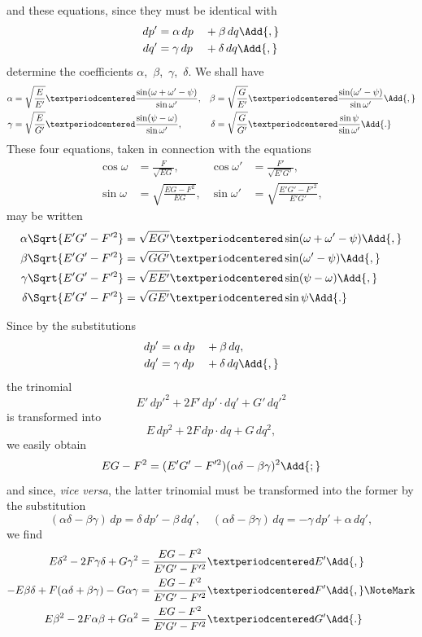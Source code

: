 and these equations, since they must be identical with
\begin{alignat*}{2}
dp' &= \alpha\, dp &&+ \beta\,  dq\Add{,} \\
dq' &= \gamma\, dp &&+ \delta\, dq\Add{,}
\end{alignat*}
determine the coefficients $\alpha$,~$\beta$,~$\gamma$,~$\delta$. We shall have
\begin{align*}
\alpha &= \sqrt{\frac{E}{E'}}·\frac{\sin(\omega + \omega' - \psi)}{\sin\omega'}, &
\beta  &= \sqrt{\frac{G}{E'}}·\frac{\sin(\omega' - \psi)}{\sin\omega'}\Add{,} \\
\gamma &= \sqrt{\frac{E}{G'}}·\frac{\sin(\psi - \omega)}{\sin\omega'}, &
\delta &= \sqrt{\frac{G}{G'}}·\frac{\sin\psi}{\sin\omega'}\Add{.}
\end{align*}
These four equations, taken in connection with the equations
\begin{align*}
\cos\omega  &= \frac{F}{\sqrt{EG}}, &
\cos\omega' &= \frac{F'}{\sqrt{E'G'}}, \\
\sin\omega  &= \sqrt{\frac{EG - F^{2}}{EG}}, &
\sin\omega' &= \sqrt{\frac{E'G' - F'^{2}}{E'G'}},
\end{align*}
may be written
\begin{align*}
\alpha\Sqrt{E'G' - F'^{2}} &= \sqrt{EG'}·\sin(\omega + \omega' - \psi)\Add{,} \\
\beta \Sqrt{E'G' - F'^{2}} &= \sqrt{GG'}·\sin(\omega' - \psi)\Add{,} \\
\gamma\Sqrt{E'G' - F'^{2}} &= \sqrt{EE'}·\sin(\psi - \omega)\Add{,} \\
\delta\Sqrt{E'G' - F'^{2}} &= \sqrt{GE'}·\sin \psi\Add{.}
\end{align*}

Since by the substitutions
\begin{alignat*}{2}
dp' &= \alpha\, dp &&+ \beta\,  dq, \\
dq' &= \gamma\, dp &&+ \delta\, dq\Add{,}
\end{alignat*}
the trinomial
\[
E'\, dp'^{2} + 2F'\, dp'·dq' + G'\, dq'^{2}
\]
is transformed into
\[
E\, dp^{2} + 2F\, dp·dq + G\, dq^{2},
\]
we easily obtain
\[
EG - F^{2} = (E'G' - F'^{2})(\alpha\delta - \beta\gamma)^{2}\Add{;}
\]
and since, \textit{vice versa}, the latter trinomial must be transformed into the former by the
substitution
\[
(\alpha\delta - \beta\gamma)\, dp =  \delta\, dp' - \beta\, dq',\quad
(\alpha\delta - \beta\gamma)\, dq = -\gamma\, dp' + \alpha\, dq',
\]
we find
\begin{align*}
E\delta^{2} - 2F\gamma\delta + G\gamma^{2}
  &= \frac{EG - F^{2}}{E'G' - F'^{2}}·E'\Add{,} \\
%
-E\beta\delta + F(\alpha\delta + \beta\gamma) - G\alpha\gamma
  &= \frac{EG - F^{2}}{E'G' - F'^{2}}·F'\Add{,}\NoteMark \\
%
E\beta^{2} - 2F\alpha\beta + G\alpha^{2}
  &= \frac{EG - F^{2}}{E'G' - F'^{2}}·G'\Add{.}
\end{align*}


